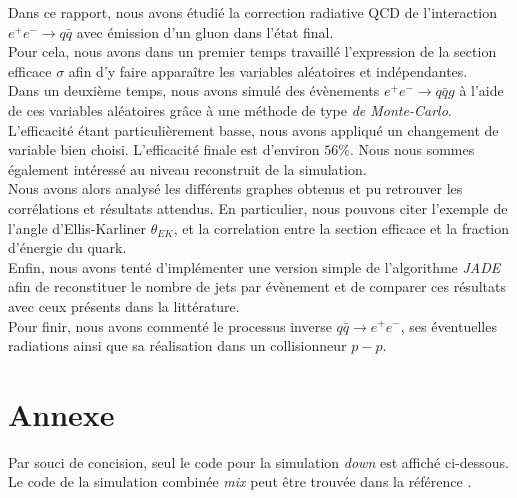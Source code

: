 \documentclass[a4paper]{article} %
\numberwithin{equation}{section} %
\theoremstyle{definition}
\theoremstyle{remark}
\theoremstyle{plain}%
\theoremstyle{style_exemple}
\begin{document}
Dans ce rapport, nous avons étudié la correction radiative QCD de l'interaction $e^+e^-\rightarrow q\bar q$ avec émission d'un gluon dans l'état final.\\
Pour cela, nous avons dans un premier temps travaillé l'expression de la section efficace $\sigma$ afin d'y faire apparaître les variables aléatoires et indépendantes.\\
Dans un deuxième temps, nous avons simulé des évènements $e^+e^-\rightarrow q\bar q g$ à l'aide de ces variables aléatoires grâce à une méthode de type \textit{de Monte-Carlo}. L'efficacité étant particulièrement basse, nous avons appliqué un changement de variable bien choisi. L'efficacité finale est d'environ $56\%$. Nous nous sommes également intéressé au niveau reconstruit de la simulation.\\
Nous avons alors analysé les différents graphes obtenus et pu retrouver les corrélations  et résultats attendus. En particulier, nous pouvons citer l'exemple de l'angle d'Ellis-Karliner $\theta_{EK}$, et la correlation entre la section efficace et la fraction d'énergie du quark.\\
Enfin, nous avons tenté d'implémenter une version simple de l'algorithme \textit{JADE} afin de reconstituer le nombre de jets par évènement et de comparer ces résultats avec ceux présents dans la littérature.\\
Pour finir, nous avons commenté le processus inverse $q \bar{q}\rightarrow e^+e^-$, ses éventuelles radiations ainsi que sa réalisation dans un collisionneur $p-p$.\\

\newpage
\section{Annexe}
Par souci de concision, seul le code pour la simulation \textit{down} est affiché ci-dessous. Le code de la simulation combinée \textit{mix} peut être trouvée dans la référence \cite{codes}. 
\label{code_tp5}




\printbibliography
\end{document}
